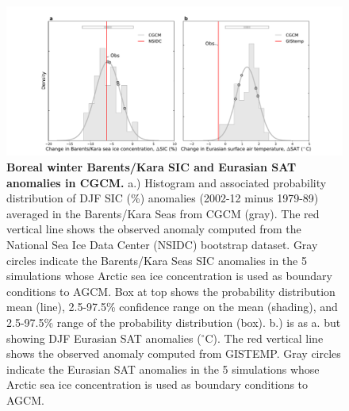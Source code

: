 \documentclass{nature}
\begin{document}
\begin{figure}%
\centering
\noindent\includegraphics[width=39pc]{Word/Figure_2.pdf}
\caption{\textbf{Boreal winter Barents/Kara SIC and Eurasian SAT anomalies in CGCM.} a.) Histogram and associated probability distribution of DJF SIC (\%) anomalies (2002-12 minus 1979-89) averaged in the Barents/Kara Seas from CGCM (gray). The red vertical line shows the observed anomaly computed from the National Sea Ice Data Center (NSIDC) bootstrap dataset. Gray circles indicate the Barents/Kara Seas SIC anomalies in the 5 simulations whose Arctic sea ice concentration is used as boundary conditions to AGCM. Box at top shows the probability distribution mean (line), 2.5-97.5\% confidence range on the mean (shading), and 2.5-97.5\% range of the probability distribution (box). b.) is as a. but showing DJF Eurasian SAT anomalies ($^\circ$C). The red vertical line shows the observed anomaly computed from GISTEMP. Gray circles indicate the Eurasian SAT anomalies in the 5 simulations whose Arctic sea ice concentration is used as boundary conditions to AGCM. 
} %
\label{fig:fig2} 
\end{figure}
\end{document}
